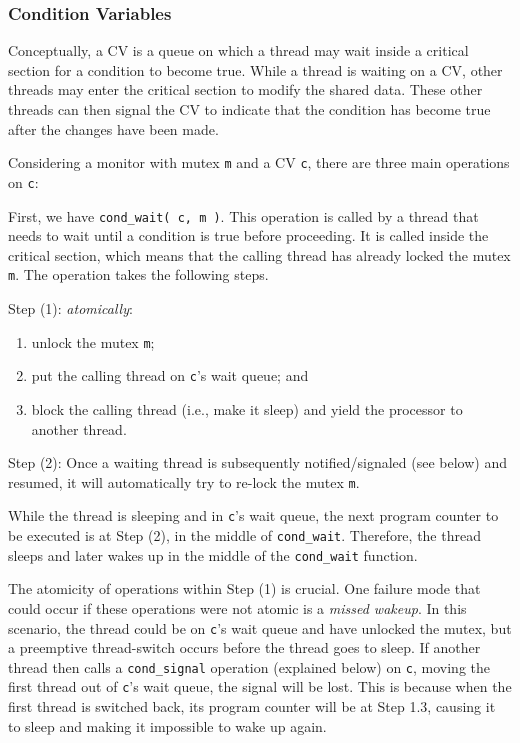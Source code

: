 \subsubsection*{Condition Variables}

Conceptually, a CV is a queue on which a thread may wait inside a critical section for a condition to become true.
While a thread is waiting on a CV, other threads may enter the critical section to modify the shared data.
These other threads can then signal the CV to indicate that the condition has become true after the changes have been made.

Considering a monitor with mutex \texttt{m} and a CV \texttt{c}, there are three main operations on \texttt{c}:

First, we have \texttt{cond\_wait( c, m )}.
This operation is called by a thread that needs to wait until a condition is true before proceeding.
It is called inside the critical section, which means that the calling thread has already locked the mutex \texttt{m}.
The operation takes the following steps.

Step (1): \emph{atomically}:
\begin{enumerate}
    \item unlock the mutex \texttt{m};
    \item put the calling thread on \texttt{c}'s wait queue; and
    \item block the calling thread (i.e., make it sleep) and yield the processor to another thread.
\end{enumerate}

Step (2): Once a waiting thread is subsequently notified/signaled (see below) and resumed, it will automatically try to re-lock the mutex \texttt{m}.

While the thread is sleeping and in \texttt{c}'s wait queue, the next program counter to be executed is at Step (2), in the middle of \texttt{cond\_wait}.
Therefore, the thread sleeps and later wakes up in the middle of the \texttt{cond\_wait} function.

The atomicity of operations within Step (1) is crucial.
One failure mode that could occur if these operations were not atomic is a \emph{missed wakeup}.
In this scenario, the thread could be on \texttt{c}'s wait queue and have unlocked the mutex, but a preemptive thread-switch occurs before the thread goes to sleep.
If another thread then calls a \texttt{cond\_signal} operation (explained below) on \texttt{c}, moving the first thread out of \texttt{c}'s wait queue, the signal will be lost.
This is because when the first thread is switched back, its program counter will be at Step 1.3, causing it to sleep and making it impossible to wake up again.

